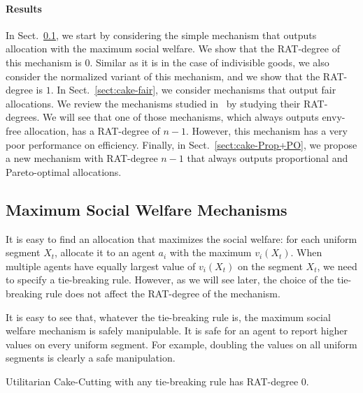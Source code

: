\paragraph{Results}
In Sect.~\ref{sect:cake-msw}, we start by considering the simple mechanism that outputs allocation with the maximum social welfare.
We show that the RAT-degree of this mechanism is $0$.
Similar as it is in the case of indivisible goods, we also consider the normalized variant of this mechanism, and we show that the RAT-degree is $1$.
In Sect.~\ref{sect:cake-fair}, we consider mechanisms that output fair allocations. We review the mechanisms studied in~\citet{BU2023Rat} by studying their RAT-degrees. 
We will see that one of those mechanisms, which always outputs envy-free allocation, has a RAT-degree of $n-1$.
However, this mechanism has a very poor performance on efficiency.
Finally, in Sect.~\ref{sect:cake-Prop+PO}, we propose a new mechanism with RAT-degree $n-1$ that always outputs proportional and Pareto-optimal allocations.

\subsection{Maximum Social Welfare Mechanisms}
\label{sect:cake-msw}
It is easy to find an allocation that maximizes the social welfare: for each uniform segment $X_t$, allocate it to an agent $a_i$ with the maximum $v_i(X_t)$.
When multiple agents have equally largest value of $v_i(X_t)$ on the segment $X_t$, we need to specify a tie-breaking rule.
However, as we will see later, the choice of the tie-breaking rule does not affect the RAT-degree of the mechanism.


It is easy to see that, whatever the tie-breaking rule is, the maximum social welfare mechanism is safely manipulable.
It is safe for an agent to report higher values on every uniform segment.
For example, doubling the values on all uniform segments is clearly a safe manipulation.

\begin{observation}
\label{obs:utilitarian-cake-cutting}
Utilitarian Cake-Cutting with any tie-breaking rule has RAT-degree $0$.
\end{observation}

